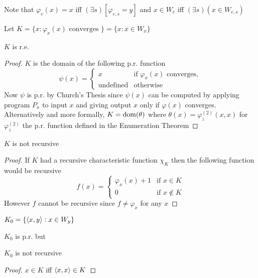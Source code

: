 \documentclass[11pt]{article}
\begin{document}
Note that \(\varphi_e(x)=x\) iff \((\exists s)[\varphi_{e,s}=y]\) and 
\(x\in W_e\) iff \((\exists s)(x\in W_{e,s})\)

\begin{definition}[]
Let \(K=\{x:\varphi_x(x)\text{ converges }\}=\{x:x\in W_x\}\)
\end{definition}
\begin{proposition}[]
\(K\) is r.e.
\end{proposition}
\begin{proof}
\(K\) is the domain of the following p.r. function
\begin{equation*}
\psi(x)=
\begin{cases}
x&\text{if } \varphi_x(x)\text{ converges},\\
\text{undefined}&\text{otherwise}
\end{cases}
\end{equation*}
Now \(\psi\) is p.r. by Church's Thesis since \(\psi(x)\) can be computed by
applying program \(P_x\) to input \(x\) and giving output \(x\) only if
\(\varphi(x)\) converges. Alternatively and more formally,
\(K=\mathrm{dom}{(\theta)}\) where \(\theta(x)=\varphi_z^{(2)}(x,x)\) for \(\varphi_z^{(2)}\)
the p.r. function defined in the Enumeration Theorem
\end{proof}
\begin{corollary}[]
\label{col1}
\(K\) is not recursive
\end{corollary}
\begin{proof}
If \(K\) had a recursive characteristic function \(\chi_K\) then the following
function would be recursive
\begin{equation*}
f(x)=
\begin{cases}
\varphi_x(x)+1&\text{if }x\in K\\
0&\text{if }x\not\in K
\end{cases}
\end{equation*}
However \(f\) cannot be recursive since \(f\neq\varphi_x\) for any \(x\)
\end{proof}
\begin{definition}[]
\(K_0=\{\langle x,y\rangle:x\in W_y\}\)
\end{definition}
\(K_0\) is p.r. but

\begin{proposition}[]
\(K_0\) is not recursive
\end{proposition}
\begin{proof}
\(x\in K\) iff \(\langle x,x\rangle\in K\)
\end{proof}
\end{document}
